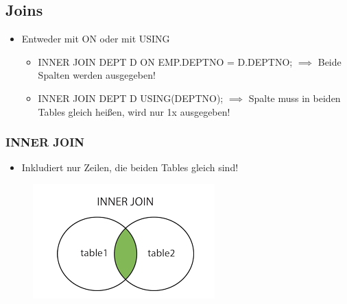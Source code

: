 \subsection{Joins}
\begin{itemize}
    \item Entweder mit ON oder mit USING
    \begin{itemize}
        \item INNER JOIN DEPT D ON EMP.DEPTNO = D.DEPTNO; $\implies$ Beide Spalten werden ausgegeben!
        \item INNER JOIN DEPT D USING(DEPTNO); $\implies$ Spalte muss in beiden Tables gleich heißen, wird nur 1x ausgegeben!
    \end{itemize}
\end{itemize}

\subsubsection{INNER JOIN}
\begin{itemize}
    \item Inkludiert nur Zeilen, die beiden Tables gleich sind!
\end{itemize}
\begin{figure}[H]
    \centering
    \includegraphics{res/themekorb_2/joins_inner_join.png} 
\end{figure}

